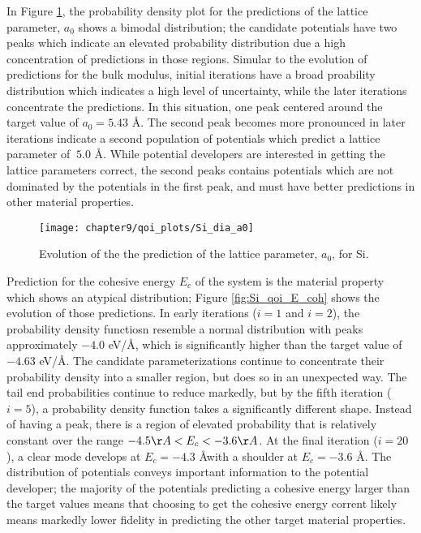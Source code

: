 In Figure \ref{fig:Si_qoi_a0}, the probability density plot for the predictions of the lattice parameter, $a_0$ shows a bimodal distribution; the candidate potentials have two peaks which indicate an elevated probability distribution due a high concentration of predictions in those regions.
Simular to the evolution of predictions for the bulk modulus, initial iterations have a broad proability distribution which indicates a high level of uncertainty, while the later iterations concentrate the predictions.
In this situation, one peak centered around the target value of $a_0=5.43$ \AA.  The second peak becomes more pronounced in later iterations indicate a second population of potentials which predict a lattice parameter of $~5.0$ \AA.
While potential developers are interested in getting the lattice parameters correct, the second peaks contains potentials which are not dominated by the potentials in the first peak, and must have better predictions in other material properties.
\begin{figure}[h]
	\centering
	\texttt{[image: chapter9/qoi\_plots/Si\_dia\_a0]}
	\caption{Evolution of the the prediction of the lattice parameter, $a_0$, for Si.}
	\label{fig:Si_qoi_a0}
\end{figure}

Prediction for the cohesive energy $E_c$ of the system is the material property which shows an atypical distribution; Figure \ref{fig:Si_qoi_E_coh} shows the evolution of those predictions.
In early iterations ($i=1$ and $i=2$), the probability density functiosn resemble a normal distribution with peaks approximately $-4.0$ eV/\AA, which is significantly higher than the target value of $-4.63$ eV/\AA.
The candidate parameterizations continue to concentrate their probability density into a smaller region, but does so in an unexpected way.  
The tail end probabilities continue to reduce markedly, but by the fifth iteration ($i=5$), a probability density function takes a significantly different shape.  
Instead of having a peak, there is a region of elevated probability that is relatively constant over the range $-4.5 \AA < E_c < -3.6 \AA$.
At the final iteration ($i=20$), a clear mode develops at $E_c=-4.3$ \AA with a shoulder at $E_c=-3.6$ \AA.
The distribution of potentials conveys important information to the potential developer; the majority of the potentials predicting a cohesive energy larger than the target values means that choosing to get the cohesive energy corrent likely means markedly lower fidelity in predicting the other target material properties.

